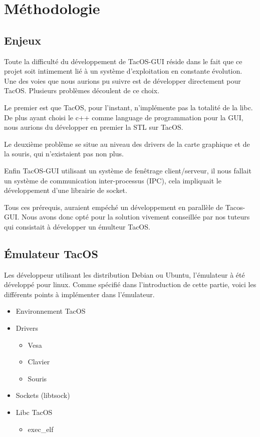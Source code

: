 \section{Méthodologie}

\subsection{Enjeux}

Toute la difficulté du développement de TacOS-GUI réside dans le fait que ce projet soit intimement lié à un système d'exploitation en constante évolution. Une des voies que nous aurions pu suivre est de développer directement pour TacOS. Plusieurs problèmes découlent de ce choix. 

Le premier est que TacOS, pour l'instant, n'implémente pas la totalité de la libc. De plus ayant choisi le c++ comme language de programmation pour la GUI, nous aurions du développer en premier la STL sur TacOS.

Le deuxième problème se situe au niveau des drivers de la carte graphique et de la souris, qui n'existaient pas non plus.

Enfin TacOS-GUI utilisant un système de fenêtrage client/serveur, il nous fallait un système de communication inter-processus (IPC), cela impliquait le développement d'une librairie de socket.

Tous ces prérequis, auraient empéché un développement en parallèle de Tacos-GUI. Nous avons donc opté pour la solution vivement conseillée par nos tuteurs qui consistait à développer un émulteur TacOS.

\subsection{Émulateur TacOS}

Les développeur utilisant les distribution Debian ou Ubuntu, l'émulateur à été développé pour linux. Comme spécifié dans l'introduction de cette partie, voici les différents points à implémenter dans l'émulateur.

\begin{itemize}
  \item Environnement TacOS
  \item Drivers
  \begin{itemize}
    \item Vesa
    \item Clavier
    \item Souris 
  \end{itemize}
  \item Sockets (libtsock)
  \item Libc TacOS
  \begin{itemize}
    \item exec\_elf
  \end{itemize}
\end{itemize}

